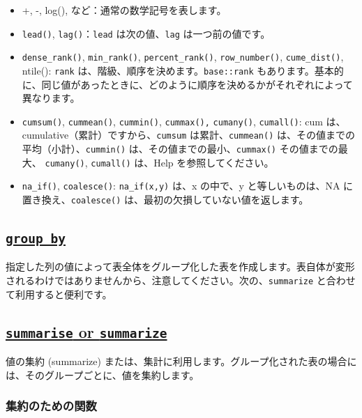 \documentclass[
  xelatex, ja=standard]{bxjsbook}
\theoremstyle{definition}
\theoremstyle{definition}
\theoremstyle{definition}
\theoremstyle{definition}
\theoremstyle{remark}
\begin{document}
\begin{itemize}
\item
  +, -, log(), など：通常の数学記号を表します。
\item
  \texttt{lead()}, \texttt{lag()}：\texttt{lead} は次の値、\texttt{lag} は一つ前の値です。
\item
  \texttt{dense\_rank()}, \texttt{min\_rank()}, \texttt{percent\_rank()}, \texttt{row\_number()}, \texttt{cume\_dist()}, ntile(): \texttt{rank} は、階級、順序を決めます。\texttt{base::rank} もあります。基本的に、同じ値があったときに、どのように順序を決めるかがそれぞれによって異なります。
\item
  \texttt{cumsum()}, \texttt{cummean()}, \texttt{cummin()}, \texttt{cummax(),} \texttt{cumany()}, \texttt{cumall()}: cum は、cumulative（累計）ですから、\texttt{cumsum} は累計、\texttt{cummean()} は、その値までの平均（小計）、\texttt{cummin()} は、その値までの最小、\texttt{cummax()} その値までの最大、 \texttt{cumany()}, \texttt{cumall()} は、Help を参照してください。
\item
  \texttt{na\_if()}, \texttt{coalesce()}: \texttt{na\_if(x,y)} は、x の中で、y と等しいものは、NA に置き換え、\texttt{coalesce()} は、最初の欠損していない値を返します。
\end{itemize}

\hypertarget{group_by}{%
\subsection{\texorpdfstring{\href{https://dplyr.tidyverse.org/reference/group_by.html}{\texttt{group\_by}}}{group\_by}}\label{group_by}}

指定した列の値によって表全体をグループ化した表を作成します。表自体が変形されるわけではありませんから、注意してください。次の、\texttt{summarize} と合わせて利用すると便利です。

\hypertarget{summarise-or-summarize}{%
\subsection{\texorpdfstring{\href{https://dplyr.tidyverse.org/reference/summarise.html}{\texttt{summarise} or \texttt{summarize}}}{summarise or summarize}}\label{summarise-or-summarize}}

値の集約 (summarize) または、集計に利用します。グループ化された表の場合には、そのグループごとに、値を集約します。

\hypertarget{ux96c6ux7d04ux306eux305fux3081ux306eux95a2ux6570}{%
\subsubsection{集約のための関数}\label{ux96c6ux7d04ux306eux305fux3081ux306eux95a2ux6570}}
\end{document}
